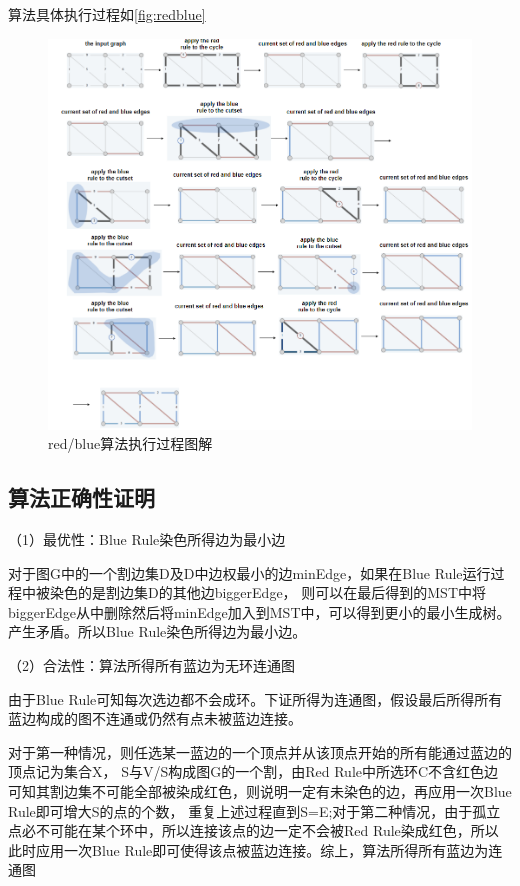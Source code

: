 算法具体执行过程如\autoref{fig:redblue}
\begin{figure}[hbt]
	\centering
	\includegraphics[scale=0.4]{image/redblue.png}
  \caption{red/blue算法执行过程图解}\label{fig:redblue}
\end{figure}

\subsection{算法正确性证明}\label{sec:redblue-proof}
\noindent（1）最优性：Blue Rule染色所得边为最小边

对于图G中的一个割边集D及D中边权最小的边minEdge，如果在Blue Rule运行过程中被染色的是割边集D的其他边biggerEdge，
则可以在最后得到的MST中将biggerEdge从中删除然后将minEdge加入到MST中，可以得到更小的最小生成树。产生矛盾。所以Blue Rule染色所得边为最小边。

\noindent（2）合法性：算法所得所有蓝边为无环连通图

由于Blue Rule可知每次选边都不会成环。下证所得为连通图，假设最后所得所有蓝边构成的图不连通或仍然有点未被蓝边连接。

对于第一种情况，则任选某一蓝边的一个顶点并从该顶点开始的所有能通过蓝边的顶点记为集合X，
S与V/S构成图G的一个割，由Red Rule中所选环C不含红色边可知其割边集不可能全部被染成红色，则说明一定有未染色的边，再应用一次Blue Rule即可增大S的点的个数，
重复上述过程直到S=E;对于第二种情况，由于孤立点必不可能在某个环中，所以连接该点的边一定不会被Red Rule染成红色，所以此时应用一次Blue Rule即可使得该点被蓝边连接。综上，算法所得所有蓝边为连通图

